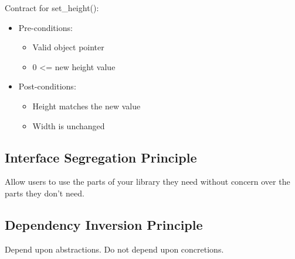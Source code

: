 \documentclass[xcolor=svgnames]{beamer}
\begin{document}
\begin{frame}{\subsecname}
    Contract for set\_height():
    \begin{itemize}
        \pause \item Pre-conditions:
        \begin{itemize}
            \pause \item Valid object pointer
            \pause \item 0 <= new height value
        \end{itemize}
        \pause \item Post-conditions:
        \begin{itemize}
            \pause \item Height matches the new value
            \pause \item Width is unchanged
        \end{itemize}
    \end{itemize}
\end{frame}


\subsection{Interface Segregation Principle}


\begin{frame}{\subsecname}
    Allow users to use the parts of your library they need without concern over
    the parts they don't need.
\end{frame}


\subsection{Dependency Inversion Principle}


\begin{frame}{\subsecname}
    Depend upon abstractions.  \pause Do not depend upon concretions.
\end{frame}

\end{document}
